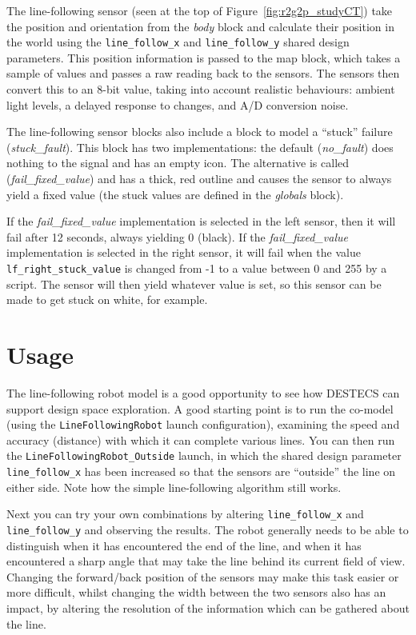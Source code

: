 The line-following sensor (seen at the top of Figure~\ref{fig:r2g2p_studyCT}) take the position and orientation from the \emph{body} block and calculate their position in the world using the \texttt{line\_follow\_x} and \texttt{line\_follow\_y} shared design parameters. This position information is passed to the map block, which takes a sample of values and passes a raw reading back to the sensors. The sensors then convert this to an 8-bit value, taking into account realistic behaviours: ambient light levels, a delayed response to changes, and A/D conversion noise.

The line-following sensor blocks also include a block to model a ``stuck'' failure (\emph{stuck\_fault}). This block has two implementations: the default (\emph{no\_fault}) does nothing to the signal and has an empty icon. The alternative is called (\emph{fail\_fixed\_value}) and has a thick, red outline and causes the sensor to always yield a fixed value (the stuck values are defined in the \emph{globals} block).

If the \emph{fail\_fixed\_value} implementation is selected in the left sensor, then it will fail after 12 seconds, always yielding 0 (black). If the \emph{fail\_fixed\_value} implementation is selected in the right sensor, it will fail when the value \texttt{lf\_right\_stuck\_value} is changed from -1 to a value between 0 and 255 by a script. The sensor will then yield whatever value is set, so this sensor can be made to get stuck on white, for example.


\section{Usage}

The line-following robot model is a good opportunity to see how
DESTECS can support design space exploration.  A good starting point
is to run the co-model (using the \texttt{LineFollowingRobot} launch configuration), examining the speed and accuracy (distance)
with which it can complete various lines. You can then run the \texttt{LineFollowingRobot\_Outside} launch, in which the shared design parameter \texttt{line\_follow\_x} has been increased so that the sensors are ``outside'' the line on either side. Note how the simple line-following algorithm still works.

Next you can try your own combinations by altering \texttt{line\_follow\_x} and \texttt{line\_follow\_y} and observing the results. The robot generally needs to be able to distinguish when it has encountered the end of the line, and when it has encountered a sharp angle that may take the line behind its
current field of view.  Changing the forward/back position of the
sensors may make this task easier or more difficult, whilst changing
the width between the two sensors also has an impact, by altering the
resolution of the information which can be gathered about the line.

